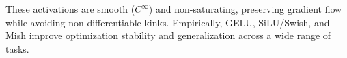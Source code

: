 These activations are smooth ($C^\infty$) and non-saturating, 
preserving gradient flow while avoiding non-differentiable kinks.  
Empirically, GELU, SiLU/Swish, and Mish improve optimization stability 
and generalization across a wide range of tasks.  







